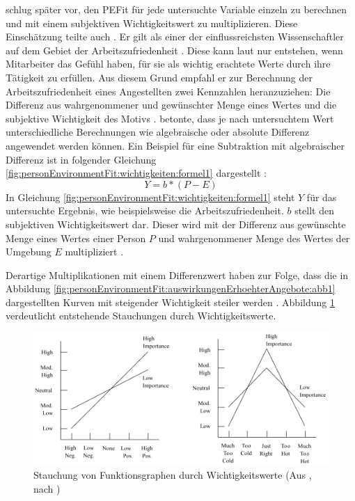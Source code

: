 \textcite[S. 38]{harrison:1985} schlug später vor, den \ac{PEFit} für jede untersuchte Variable einzeln zu berechnen und mit einem subjektiven Wichtigkeitswert zu multiplizieren. Diese Einschätzung teilte auch \textcite[S. 18]{locke:1969}\cite[S. 8f.]{locke:1976}. Er gilt als einer der einflussreichsten Wissenschaftler auf dem Gebiet der Arbeitszufriedenheit \cite[S. 12]{edwards:2008}. Diese kann laut \textcite[S. 8]{locke:1969} nur entstehen, wenn Mitarbeiter das Gefühl haben, für sie als wichtig erachtete Werte durch ihre Tätigkeit zu erfüllen. Aus diesem Grund empfahl er zur Berechnung der Arbeitszufriedenheit eines Angestellten zwei Kennzahlen heranzuziehen: Die Differenz aus wahrgenommener und gewünschter Menge eines Wertes und die subjektive Wichtigkeit des Motivs \cite[S. 8]{locke:1976}. \textcite[S. 16]{locke:1969} betonte, dass je nach untersuchtem Wert unterschiedliche Berechnungen wie algebraische oder absolute Differenz angewendet werden können. Ein Beispiel für eine Subtraktion mit algebraischer Differenz ist in folgender Gleichung \ref{fig:personEnvironmentFit:wichtigkeiten:formel1} dargestellt \cite[S. 9]{edwards:1990}:
\begin{equation}
	Y = b * (P - E)
	\label{fig:personEnvironmentFit:wichtigkeiten:formel1}
\end{equation}
In Gleichung \ref{fig:personEnvironmentFit:wichtigkeiten:formel1} steht $Y$ für das untersuchte Ergebnis, wie beispielsweise die Arbeitszufriedenheit. $b$ stellt den subjektiven Wichtigkeitswert dar. Dieser wird mit der Differenz aus gewünschte Menge eines Wertes einer Person $P$ und wahrgenommener Menge des Wertes der Umgebung $E$ multipliziert \cite[S. 9f.]{edwards:1990}.

Derartige Multiplikationen mit einem Differenzwert haben zur Folge, dass die in Abbildung \ref{fig:personEnvironmentFit:auswirkungenErhoehterAngebote:abb1} dargestellten Kurven mit steigender Wichtigkeit steiler werden \cite[S. 9]{locke:1976}. Abbildung \ref{fig:personEnvironmentFit:wichtigkeiten:abb1} verdeutlicht entstehende Stauchungen durch Wichtigkeitswerte.

\begin{figure}[h]
	\centering
	\includegraphics[width=1\textwidth]{gfx/Locke.png}
	\caption{Stauchung von Funktionsgraphen durch Wichtigkeitswerte (Aus \cite[S. 13f.]{edwards:2008}, nach \cite[S. 1305]{locke:1976})}
	\label{fig:personEnvironmentFit:wichtigkeiten:abb1}
\end{figure}

